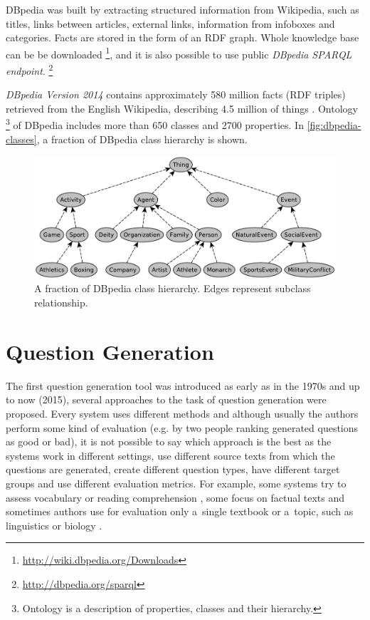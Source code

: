 \documentclass[12pt, twoside]{fithesis2}
\renewcommand{\_}{\leavevmode \kern0.07em\vbox{\hrule width0.4em}}
\begin{document}
DBpedia was built by extracting structured information from Wikipedia,
such as titles, links between articles, external links, information from infoboxes and categories.
Facts are stored in the form of an RDF graph.
Whole knowledge base can be be downloaded%
\footnote{\url{http://wiki.dbpedia.org/Downloads}}, %
and it is also possible to use public \textit{DBpedia SPARQL endpoint}.%
\footnote{\url{http://dbpedia.org/sparql}}

\emph{DBpedia Version 2014}
contains approximately 580 million facts (RDF triples) retrieved from the English Wikipedia,
describing 4.5 million of things \cite{dbpedia}.
Ontology%
\footnote{Ontology is a description of properties, classes and their hierarchy.}
of DBpedia includes more than 650 classes and 2700 properties.
In \autoref{fig:dbpedia-classes}, a fraction of DBpedia class hierarchy is shown.
\begin{figure}[h]
  \centering
  \includegraphics[width=\textwidth]{images/dbpedia-classes.pdf}
  \caption{A fraction of DBpedia class hierarchy. Edges represent subclass relationship.}
  \label{fig:dbpedia-classes}
\end{figure}


\chapter{Question Generation}
\label{chap:exercises}

The first question generation tool was introduced as early as in the 1970s \cite{questions-wolfe}
and up to now (2015), several approaches to the task of question generation were proposed.
Every system uses different methods and although usually the authors perform some kind of evaluation (e.g. by two people ranking generated questions as good or bad), it is not possible to say which approach is the best as the systems work in different settings, use different source texts from which the questions are generated, create different question types, have different target groups and use different evaluation metrics.
For example, some systems try to assess vocabulary \cite{question-gen-vocabulary}
or reading comprehension \cite{question-overgenerating-rating},
some focus on factual texts \cite{question-gen-heilman}
and sometimes authors use for evaluation only a~single textbook or a~topic, such as linguistics \cite{question-gen-mitkov} or biology \cite{question-gen-textbooks}.
\end{document}
